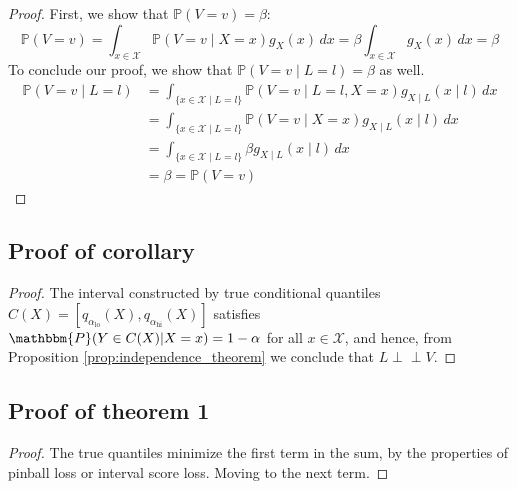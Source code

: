\documentclass{article}
\newcommand{\indep}{\perp \!\!\! \perp}
\begin{document}
\begin{appendices}
\begin{proof}
First, we show that $\mathbb{P}(V=v)=\beta$:
\begin{equation*}
\mathbb{P}(V=v) = \int_{x \in \mathcal{X}} \mathbb{P}(V=v \mid X=x) g_{X}(x)  \,dx = \beta \int_{x \in \mathcal{X}} g_{X}(x)  \,dx = \beta
\end{equation*}
 To conclude our proof, we show that $\mathbb{P}(V=v \mid L=l) = \beta$ as well.
\begin{equation*}
\begin{split}
\mathbb{P}(V=v \mid L=l) & = \int_{\{x \in \mathcal{X} \mid L=l \}} \mathbb{P}(V=v \mid L=l, X=x) g_{X \mid L}(x \mid l)  \,dx \\
& = \int_{\{x \in \mathcal{X} \mid L=l \}} \mathbb{P}(V=v \mid X=x) g_{X \mid L}(x \mid l)  \,dx \\
& = \int_{\{x \in \mathcal{X} \mid L=l \}} \beta g_{X \mid L}(x \mid l)  \,dx \\ & = \beta = \mathbb{P}(V=v)
\end{split}
\end{equation*}
\end{proof}

\subsection{Proof of corollary}\label{cor1_proof}

\begin{proof}
The interval constructed by true conditional quantiles $C(X) = [q_{\alpha_{\textrm{lo}}}(X), q_{\alpha_{\textrm{hi}}}(X)]$ satisfies $\mathbbm{P}(Y\in C(X)|X=x)=1-\alpha$ for all $x\in \mathcal{X} $, and hence, from Proposition \ref{prop:independence_theorem} we conclude that $L \indep V$.

\end{proof}


\subsection{Proof of theorem 1}\label{th2_proof}

\begin{proof}
The true quantiles minimize the first term in the sum, by the properties of pinball loss or interval score loss. Moving to the next term.


\end{proof}
\end{appendices}
\end{document}
